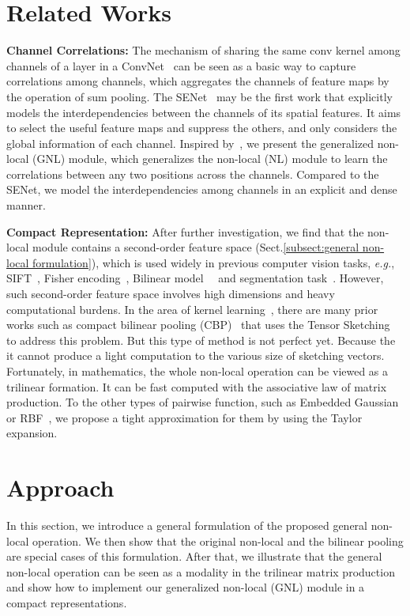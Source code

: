 \documentclass{article}
\begin{document}
\section{Related Works}
\textbf{Channel Correlations:}
The mechanism of sharing the same conv kernel among channels of a layer in a ConvNet~\cite{lenet-5} can be seen as a basic way to capture correlations among channels, which aggregates the channels of feature maps by the operation of sum pooling.
The SENet~\cite{senet} may be the first work that explicitly models the interdependencies between the channels of its spatial features.
It aims to select the useful feature maps and suppress the others, and only considers the global information of each channel.
Inspired by~\cite{non-local}, we present the generalized non-local (GNL) module, which generalizes the non-local (NL) module to learn the correlations between any two positions across the channels.
Compared to the SENet, we model the interdependencies among channels in an explicit and dense manner.

\textbf{Compact Representation:}
After further investigation, we find that the non-local module contains a second-order feature space (Sect.\ref{subsect:general non-local formulation}), which is used widely in previous computer vision tasks, \textit{e.g.}, SIFT~\cite{sift}, Fisher encoding~\cite{fisher}, Bilinear model~\cite{bilinear}~\cite{cbp} and segmentation task~\cite{order2_seg}.
However, such second-order feature space involves high dimensions and heavy computational burdens.
In the area of kernel learning~\cite{scholkopf2001learning}, there are many prior works such as compact bilinear pooling (CBP)~\cite{cbp} that uses the Tensor Sketching~\cite{tensor-sketching} to address this problem.
But this type of method is not perfect yet.
Because the it cannot produce a light computation to the various size of sketching vectors.
Fortunately, in mathematics, the whole non-local operation can be viewed as a trilinear formation.
It can be fast computed with the associative law of matrix production.
To the other types of pairwise function, such as Embedded Gaussian or RBF~\cite{rbf}, we propose a tight approximation for them by using the Taylor expansion.
\section{Approach}
In this section, we introduce a general formulation of the proposed general non-local operation.
We then show that the original non-local and the bilinear pooling are special cases of this formulation.
After that, we illustrate that the general non-local operation can be seen as a modality in the trilinear matrix production and show how to implement our generalized non-local (GNL) module in a compact representations.
\end{document}
